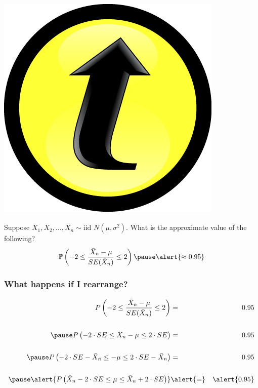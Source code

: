 \documentclass[handout]{beamer}
\newcommand{\p}{\mathbb{P}}
\begin{document}
\begin{frame}
\frametitle{\includegraphics[scale = 0.05]{./images/clicker}}
Suppose $X_1, X_2, \hdots, X_n \sim \mbox{iid } N(\mu,\sigma^2)$. What is the approximate value of the following?
	$$\p\left(-2 \leq \frac{\bar{X}_n - \mu}{SE(\bar{X}_n)} \leq 2 \right)\pause \alert{\approx 0.95}$$

\end{frame}

\begin{frame}
\frametitle{What happens if I rearrange?}
	\begin{eqnarray*}
		P\left(-2 \leq \frac{\bar{X}_n - \mu}{SE(\bar{X}_n)} \leq 2 \right) &=& 0.95\\ \\ \pause
			P\left(-2\cdot SE\leq \bar{X}_n - \mu \leq 2 \cdot SE\right) &=& 0.95\\ \\ \pause
			P\left(-2\cdot SE - \bar{X}_n \leq - \mu \leq 2 \cdot SE - \bar{X}_n \right) &=& 0.95\\ \\ \pause
			\alert{P\left( \bar{X}_n - 2\cdot SE \leq \mu \leq \bar{X}_n + 2\cdot SE \right)}&\alert{=}& \alert{0.95}
	\end{eqnarray*}

\end{frame}

\end{document}
